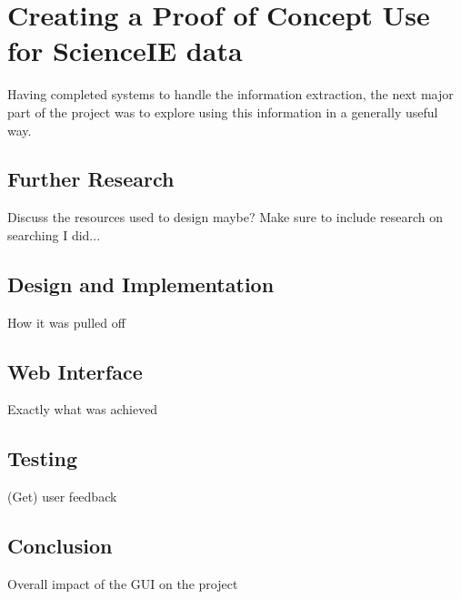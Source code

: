 \section{Creating a Proof of Concept Use for ScienceIE data}
Having completed systems to handle the information extraction, the next major part of the project was to explore using this information in a generally useful way. 

\subsection{Further Research}
Discuss the resources used to design maybe?
Make sure to include research on searching I did...
\subsection{Design and Implementation}
How it was pulled off
\subsection{Web Interface}
Exactly what was achieved
\subsection{Testing}
(Get) user feedback
\subsection{Conclusion}
Overall impact of the GUI on the project
